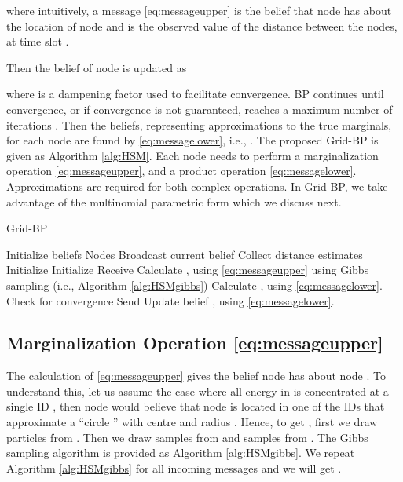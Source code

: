 \documentclass[10pt, final, journal]{IEEEtran}
\begin{document}
where intuitively, a message \eqref{eq:messageupper} is the belief that node  has about the location of node   and  is the observed value of the distance between the nodes, at time slot .

Then the belief of node  is updated as


where  is a dampening factor used to facilitate convergence.
BP continues until convergence, or if convergence is not guaranteed,  reaches a maximum number of iterations . Then the beliefs, representing approximations to the true marginals, for each node are found by \eqref{eq:messagelower}, i.e., . The proposed Grid-BP is given as Algorithm \ref{alg:HSM}. Each node needs to perform a marginalization operation \eqref{eq:messageupper}, and a product operation \eqref{eq:messagelower}. Approximations are required for both complex operations. In Grid-BP, we take advantage of the multinomial parametric form which we discuss next.

\begin{algorithm}
\caption{Grid-BP}
\begin{algorithmic}[1]
\label{alg:HSM}

\STATE Initialize beliefs  Nodes
\STATE Broadcast current belief 
\FORALL{ }
\STATE Collect distance estimates  
\ENDFOR
\ENDFOR
\STATE Initialize 
\STATE Initialize 
\REPEAT
{}
\FORALL{ }
\STATE Receive 
\STATE Calculate  , using \eqref{eq:messageupper} using Gibbs sampling (i.e., Algorithm \ref{alg:HSMgibbs})
\ENDFOR
\STATE Calculate  , using \eqref{eq:messagelower}.
\STATE Check for convergence
\STATE Send 
\ENDFOR
{}
\STATE Update belief , using \eqref{eq:messagelower}.
\ENDFOR
\end{algorithmic}
\end{algorithm}
 \vspace{-.1in}

\subsection{Marginalization Operation \eqref{eq:messageupper}}\label{marginilizationoperation}
The calculation of \eqref{eq:messageupper} gives the belief node  has about node . To understand this, let us assume the case where all energy in   is concentrated at a single ID , then node  would believe that  node  is located in one of the IDs that approximate  a ``circle '' with centre  and radius  . Hence, to get , first we draw  particles from . Then we draw  samples from   and  samples from . The Gibbs sampling algorithm is provided as Algorithm \ref{alg:HSMgibbs}.  We repeat Algorithm  \ref{alg:HSMgibbs} for all incoming messages and we will get  .
\end{document}
